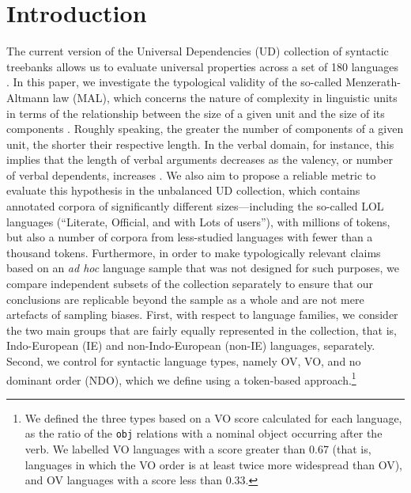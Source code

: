 \section{Introduction}

The current version of the Universal Dependencies (UD) collection of syntactic treebanks allows us to evaluate universal properties across a set of 180 languages . In this paper, we investigate the typological validity of the so-called Menzerath-Altmann law (MAL), which concerns the nature of complexity in linguistic units in terms of the relationship between the size of a given unit and the size of its components \citep{menzerath1928einige, menzerath1954architektonik, altmann1980prolegomena}. Roughly speaking, the greater the number of components of a given unit, the shorter their respective length. In the verbal domain, for instance, this implies that the length of verbal arguments decreases as the valency, or number of verbal dependents, increases \citep{macutek2017menzerath}. We also aim to propose a reliable metric to evaluate this hypothesis in the unbalanced UD collection, which contains annotated corpora of significantly different sizes---including the so-called LOL languages (``Literate, Official, and with Lots of users''), with millions of tokens, but also a number of corpora from less-studied languages with fewer than a thousand tokens. Furthermore, in order to make typologically relevant claims based on an \textit{ad hoc} language sample that was not designed for such purposes, we compare independent subsets of the collection separately to ensure that our conclusions are replicable beyond the sample as a whole and are not mere artefacts of sampling biases. First, with respect to language families, we consider the two main groups that are fairly equally represented in the collection, that is, Indo-European (IE) and non-Indo-European (non-IE) languages, separately. Second, we control for syntactic language types, namely OV, VO, and no dominant order (NDO), which we define using a token-based approach.\footnote{We defined the three types based on a VO score calculated for each language, as the ratio of the \texttt{obj} relations with a nominal object occurring after the verb. We labelled VO languages with a score greater than 0.67 (that is, languages in which the VO order is at least twice more widespread than OV), and OV languages with a score less than 0.33.}


